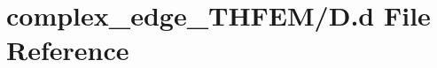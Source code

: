 \hypertarget{complex__edge___t_h_f_e_m_2_d_8d}{}\section{complex\+\_\+edge\+\_\+\+T\+H\+F\+E\+M/D.d File Reference}
\label{complex__edge___t_h_f_e_m_2_d_8d}
